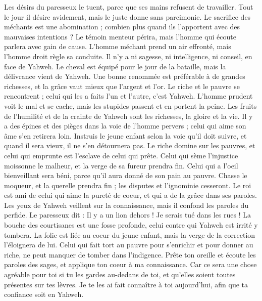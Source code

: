 \begin{multicols}{2}
Les désirs du paresseux le tuent, parce que ses mains refusent de travailler.
Tout le jour il désire avidement, mais le juste donne sans parcimonie.
Le sacrifice des méchants est une abomination ; combien plus quand ils l'apportent avec des mauvaises intentions ?
Le témoin menteur périra, mais l'homme qui écoute parlera avec gain de cause.
L'homme méchant prend un air effronté, mais l'homme droit règle sa conduite.
Il n'y a ni sagesse, ni intelligence, ni conseil, en face de Yahweh.
Le cheval est équipé pour le jour de la bataille, mais la délivrance vient de Yahweh.
\VerseOne{}Une bonne renommée est préférable à de grandes richesses, et la grâce vaut mieux que l'argent et l'or.
Le riche et le pauvre se rencontrent ; celui qui les a faits l’un et l’autre, c'est Yahweh.
L'homme prudent voit le mal et se cache, mais les stupides passent et en portent la peine.
Les fruits de l’humilité et de la crainte de Yahweh sont les richesses, la gloire et la vie.
Il y a des épines et des pièges dans la voie de l’homme pervers ; celui qui aime son âme s'en retirera loin.
Instruis le jeune enfant selon la voie qu’il doit suivre, et quand il sera vieux, il ne s'en détournera pas.
Le riche domine sur les pauvres, et celui qui emprunte est l’esclave de celui qui prête.
Celui qui sème l’injustice moissonne le malheur, et la verge de sa fureur prendra fin.
Celui qui a l'oeil bienveillant sera béni, parce qu'il aura donné de son pain au pauvre.
Chasse le moqueur, et la querelle prendra fin ; les disputes et l'ignominie cesseront.
Le roi est ami de celui qui aime la pureté de coeur, et qui a de la grâce dans ses paroles.
Les yeux de Yahweh veillent sur la connaissance, mais il confond les paroles du perfide.
Le paresseux dit : Il y a un lion dehors ! Je serais tué dans les rues !
La bouche des courtisanes est une fosse profonde, celui contre qui Yahweh est irrité y tombera.
La folie est liée au coeur du jeune enfant, mais la verge de la correction l’éloignera de lui.
Celui qui fait tort au pauvre pour s’enrichir et pour donner au riche, ne peut manquer de tomber dans l'indigence.
Prête ton oreille et écoute les paroles des sages, et applique ton coeur à ma connaissance.
Car ce sera une chose agréable pour toi si tu les gardes au-dedans de toi, et qu’elles soient toutes présentes sur tes lèvres.
Je te les ai fait connaître à toi aujourd’hui, afin que ta confiance soit en Yahweh.

\end{multicols}
